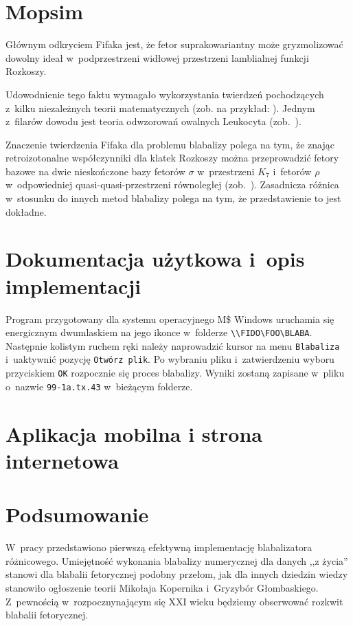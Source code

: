 \chapter{Mopsim}\label{r:mopsim}

Głównym odkryciem Fifaka jest, że fetor suprakowariantny może
gryzmolizować dowolny ideał w~podprzestrzeni widłowej przestrzeni
lamblialnej funkcji Rozkoszy.

Udowodnienie tego faktu wymagało wykorzystania twierdzeń pochodzących
z~kilku niezależnych teorii matematycznych (zob. na przykład:
\cite{russell,spyrpt,JR,beaman,hopp,srinis}).  Jednym z~filarów
dowodu jest teoria odwzorowań owalnych Leukocyta (zob.~\cite{leuk}).

Znaczenie twierdzenia Fifaka dla problemu blabalizy polega na tym, że
znając retroizotonalne współczynniki dla klatek Rozkoszy można
przeprowadzić fetory bazowe na dwie nieskończone bazy fetorów $\sigma$
w~przestrzeni $K_7$ i~fetorów $\rho$ w~odpowiedniej
quasi-quasi-przestrzeni równoległej (zob.~\cite{hopp}).  Zasadnicza
różnica w~stosunku do innych metod blabalizy polega na tym, że
przedstawienie to jest dokładne.

\chapter{Dokumentacja użytkowa i~opis implementacji}\label{r:impl}

Program przygotowany dla systemu operacyjnego M\$ Windows uruchamia
się energicznym dwumlaskiem na jego ikonce w~folderze
\verb+\\FIDO\FOO\BLABA+.  Następnie kolistym ruchem ręki należy
naprowadzić kursor na menu \texttt{Blabaliza} i~uaktywnić pozycję
\texttt{Otwórz plik}.  Po wybraniu pliku i~zatwierdzeniu wyboru
przyciskiem \texttt{OK} rozpocznie się proces blabalizy.  Wyniki
zostaną zapisane w~pliku o~nazwie \texttt{99-1a.tx.43} w~bieżącym
folderze.

\chapter{Aplikacja mobilna i strona internetowa}\label{r:apka} 

\chapter{Podsumowanie}

W~pracy przedstawiono pierwszą efektywną implementację blabalizatora
różnicowego.  Umiejętność wykonania blabalizy numerycznej dla danych
,,z życia'' stanowi dla blabalii fetorycznej podobny przełom, jak dla
innych dziedzin wiedzy stanowiło ogłoszenie teorii Mikołaja Kopernika
i~Gryzybór Głombaskiego.  Z~pewnością w~rozpocznynającym się XXI wieku
będziemy obserwować rozkwit blabalii fetorycznej.

